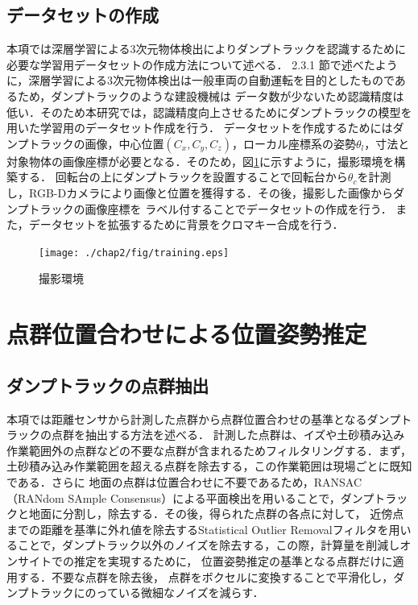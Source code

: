 \clearpage

\subsection{データセットの作成}
本項では深層学習による3次元物体検出によりダンプトラックを認識するために必要な学習用データセットの作成方法について述べる．
2.3.1 節で述べたように，深層学習による3次元物体検出は一般車両の自動運転を目的としたものであるため，ダンプトラックのような建設機械は
データ数が少ないため認識精度は低い．そのため本研究では，認識精度向上させるためにダンプトラックの模型を用いた学習用のデータセット作成を行う．
データセットを作成するためにはダンプトラックの画像，中心位置$(C_x, C_y, C_z)$，ローカル座標系の姿勢$\theta_l$，寸法と対象物体の画像座標が必要となる．そのため，図\ref{fig:train}に示すように，撮影環境を構築する．
回転台の上にダンプトラックを設置することで回転台から$\theta_c$を計測し，RGB-Dカメラにより画像と位置を獲得する．その後，撮影した画像からダンプトラックの画像座標を
ラベル付することでデータセットの作成を行う．
また，データセットを拡張するために背景をクロマキー合成を行う．


\begin{figure}[b]
    \begin{center}
    \texttt{[image: ./chap2/fig/training.eps]}
    \caption{撮影環境}
    \label{fig:train}
    \end{center}
\end{figure}
\newpage

\section{点群位置合わせによる位置姿勢推定}
\subsection{ダンプトラックの点群抽出}
本項では距離センサから計測した点群から点群位置合わせの基準となるダンプトラックの点群を抽出する方法を述べる．
計測した点群は、イズや土砂積み込み作業範囲外の点群などの不要な点群が含まれるためフィルタリングする．まず，土砂積み込み作業範囲を超える点群を除去する，この作業範囲は現場ごとに既知である．さらに
地面の点群は位置合わせに不要であるため，RANSAC （RANdom SAmple Consensus）\cite{Fischler1981}による平面検出を用いることで，ダンプトラックと地面に分割し，除去する．その後，得られた点群の各点に対して，
近傍点までの距離を基準に外れ値を除去するStatistical Outlier Removalフィルタを用いることで，ダンプトラック以外のノイズを除去する，この際，計算量を削減しオンサイトでの推定を実現するために，
位置姿勢推定の基準となる点群だけに適用する．不要な点群を除去後，
点群をボクセルに変換することで平滑化し，ダンプトラックにのっている微細なノイズを減らす．
\newpage

